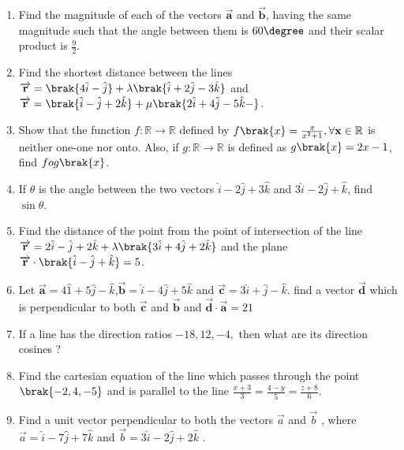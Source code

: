 \begin{enumerate}
	\item Find the magnitude of each of the vectors $\overrightarrow{\mathbf{a}}$ and $\overrightarrow{\mathbf{b}}$, having the same magnitude such that the angle between them is ${60\degree}$ and their scalar product is $\frac{9}{2}$.
 
 \item Find the shortest distance between the lines $\overrightarrow{\mathbf{r}}=\brak{4\hat{i}-\hat{j}}+\lambda\brak{\hat{i}+2\hat{j}-3\hat{k}}$ and $\overrightarrow{\mathbf{r}}=\brak{\hat{i}-\hat{j}+2\hat{k}}+\mu\brak{2\hat{i}+4\hat{j}-5\hat{k}-} $.

\item Show that the function $f:\mathbb{R}\rightarrow \mathbb{R}$ defined by $f\brak{x} = \frac{x}{x^{2}+1}, \forall \mathbf{x}\in \mathbb{R}$ is neither one-one nor onto. Also, if $g:\mathbb{R} \rightarrow \mathbb{R}$ is defined as $g\brak{x}=2x-1$, find $fog\brak{x}$.

\item If $\theta$ is the angle between the two vectors $\hat{i}-2\hat{j}+3\hat{k}$ and $3\hat{i}-2\hat{j}+\hat{k}$, find $\sin\theta$.

\item  Find the distance of the point  from the point of intersection of the line $\overrightarrow{\mathbf{r}}=2\hat{i}-\hat{j}+2\hat{k} + \lambda\brak{3\hat{i}+4\hat{j}+2\hat{k}}$ and the plane $\overrightarrow{\mathbf{r}}\cdot\brak{\hat{i}-\hat{j}+\hat{k}}=5$.

\item Let $\overrightarrow{\mathbf{a}}=4\hat{1}+5\hat{j}-\hat{k}$,$\overrightarrow{\mathbf{b}}=\hat{i}-4\hat{j}+5\hat{k}$ and $\overrightarrow{\mathbf{c}}=3\hat{i}+\hat{j}-\hat{k}$. find a vector $\overrightarrow{\mathbf{d}}$ which is perpendicular to both $\overrightarrow{\mathbf{c}}$ and $\overrightarrow{\mathbf{b}}$ and $\overrightarrow{\mathbf{d}}\cdot \overrightarrow{\mathbf{a}}=21$

\item If a line has the direction ratios $-18, 12, -4,$ then what are its direction cosines ?
\item Find the cartesian equation of the line which passes through the point $\brak{-2, 4, -5}$ and is parallel to the line $\frac{x+3}{3}=\frac{4-y}{5}=\frac{z+8}{6}$.
\item Find a unit vector perpendicular to both the vectors $\overrightarrow{a}$ and $\overrightarrow{b}$ , where $\overrightarrow{a} = \hat{i} -7 \hat{j} + 7\hat{k}$ and $\overrightarrow{b} = 3\hat{i} -2 \hat{j} + 2\hat{k}$ .


\end{enumerate}
